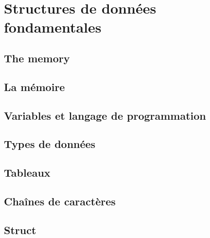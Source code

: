 \chapter{Structures de donn\'ees fondamentales}
\chaptertoc
\section{The memory}
\section{La mémoire}
\section{Variables et langage de programmation}
\section{Types de données}
\section{Tableaux}
\section{Chaînes de caractères}
\section{Struct}